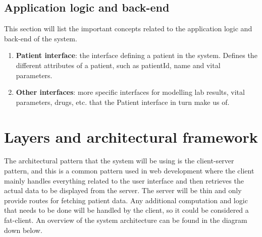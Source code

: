 \documentclass{article}
\begin{document}
\subsection{Application logic and back-end}
This section will list the important concepts related to the application logic and back-end of the system.
\begin{enumerate}
    \item \textbf{Patient interface}: the interface defining a patient in the system. Defines the different attributes of a patient, such as patientId, name and vital parameters.
        \linebreak{}
     \item \textbf{Other interfaces}: more specific interfaces for modelling lab results, vital parameters, drugs, etc. that the Patient interface in turn make us of. 
        \linebreak{}
\end{enumerate}

\section{Layers and architectural framework}
The architectural pattern that the system will be using is the client-server pattern, and this is a common pattern used in web development where the client mainly handles everything related to the user interface and then retrieves the actual data to be displayed from the server. The server will be thin and only provide routes for fetching patient data. Any additional computation and logic that needs to be done will be handled by the client, so it could be considered a fat-client. An overview of the system architecture can be found in the diagram down below.  


\end{document}
